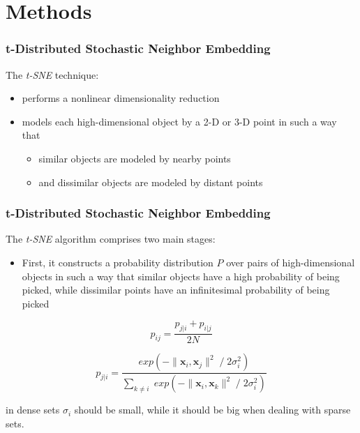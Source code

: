 \section{Methods}

\begin{frame}
	\frametitle{t-Distributed Stochastic Neighbor Embedding}
	
	The \emph{t-SNE} technique:
	
	\begin{itemize}
		\item performs a nonlinear dimensionality reduction
		\item models each high-dimensional object by a 2-D or 3-D point in such a way that
			  \begin{itemize}
			  	  \item similar objects are modeled by nearby points
			  	  \item and dissimilar objects are modeled by distant points
			  \end{itemize}
	\end{itemize}
\end{frame}

\begin{frame}
	\frametitle{t-Distributed Stochastic Neighbor Embedding}
	
	\vspace{0.2cm}
	
	The \emph{t-SNE} algorithm comprises two main stages:
	
	\begin{itemize}
		\item First, it constructs a probability distribution $ P $ over pairs of high-dimensional objects in such a
			  way that similar objects have a high probability of being picked, while dissimilar points have an
			  infinitesimal probability of being picked
	\end{itemize}
	
	\begin{equation*}
		p_{ij} = \frac{p_{j|i} + p_{i|j}}{2N}
	\end{equation*}
	
	\begin{equation*}
		p_{j|i} = \frac{exp(-\| \boldsymbol{x}_i,\boldsymbol{x}_j \|^2 \; / \; 2\sigma_i^2)}{\sum_{k \neq i} \; exp(-\| \boldsymbol{x}_i,\boldsymbol{x}_k \|^2 \; / \; 2\sigma_i^2)}
	\end{equation*}
	
	\vspace{0.2cm}
	
	in dense sets $ \sigma_i $ should be small, while it should be big when dealing with sparse sets.
\end{frame}


